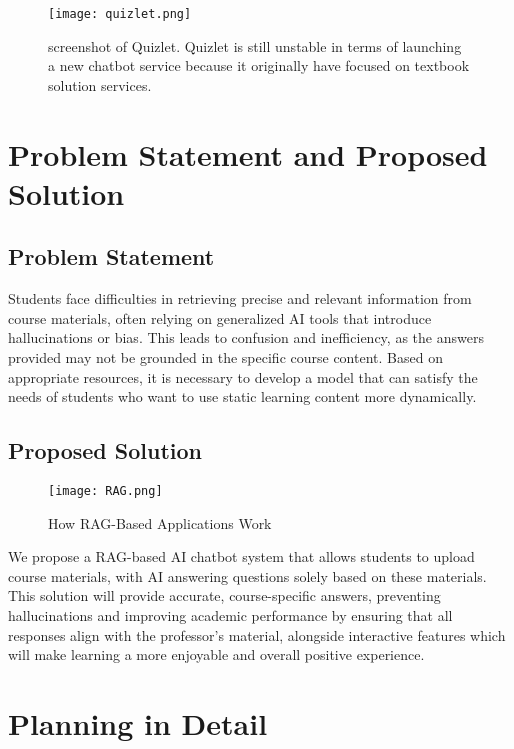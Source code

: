 \documentclass[runningheads]{llncs}
\begin{document}
\begin{spacing}{1.25}
\begin{figure}
\texttt{[image: quizlet.png]}
\caption{screenshot of Quizlet. Quizlet is still unstable in terms of launching a new chatbot service because it originally have focused on textbook solution services.} \label{fig3}
\end{figure}


\section{Problem Statement and Proposed Solution}
\subsection{Problem Statement}
Students face difficulties in retrieving precise and relevant information from course materials, often relying on generalized AI tools that introduce hallucinations or bias. This leads to confusion and inefficiency, as the answers provided may not be grounded in the specific course content. Based on appropriate resources, it is necessary to develop a model that can satisfy the needs of students who want to use static learning content more dynamically.

\subsection{Proposed Solution}

\begin{figure}
\texttt{[image: RAG.png]}
\caption{How RAG-Based Applications Work} \label{fig4}
\end{figure}

We propose a RAG-based AI chatbot system that allows students to upload course materials, with AI answering questions solely based on these materials. This solution will provide accurate, course-specific answers, preventing hallucinations and improving academic performance by ensuring that all responses align with the professor’s material, alongside interactive features which will make learning a more enjoyable and overall positive experience.


\section{Planning in Detail}


\end{spacing}
\end{document}
